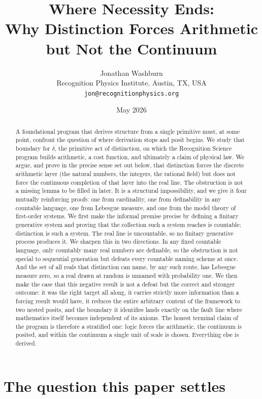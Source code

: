 \documentclass[11pt,a4paper]{article}
\title{%
  Where Necessity Ends:\\
  Why Distinction Forces Arithmetic but Not the Continuum}
\author{%
  Jonathan Washburn\\
  Recognition Physics Institute, Austin, TX, USA\\
  \texttt{jon@recognitionphysics.org}}
\date{May 2026}
\theoremstyle{definition}
\theoremstyle{remark}
\begin{document}
\maketitle

\begin{abstract}\sloppy
A foundational program that derives structure from a single primitive must, at
some point, confront the question of where derivation stops and posit begins. We
study that boundary for $\delta$, the primitive act of distinction, on which the
Recognition Science program builds arithmetic, a cost function, and ultimately a
claim of physical law. We argue, and prove in the precise sense set out below,
that distinction forces the discrete arithmetic layer (the natural numbers, the
integers, the rational field) but does not force the continuous completion of
that layer into the real line. The obstruction is not a missing lemma to be
filled in later. It is a structural impossibility, and we give it four
mutually reinforcing proofs: one from cardinality, one from definability in any
countable language, one from Lebesgue measure, and one from the model theory of
first-order systems. We first make the informal premise precise by defining a
finitary generative system and proving that the collection such a system reaches
is countable; distinction is such a system. The real line is uncountable, so no
finitary generative process produces it. We sharpen this in two directions. In
any fixed countable language, only countably many real numbers are definable, so
the obstruction is not special to sequential generation but defeats every
countable naming scheme at once. And the set of all reals that distinction can
name, by any such route, has Lebesgue measure zero, so a real drawn at random is
unnamed with probability one. We then make the case that this negative result is
not a defeat but the correct and stronger outcome: it was the right target all
along, it carries strictly more information than a forcing result would have, it
reduces the entire arbitrary content of the framework to two nested posits, and
the boundary it identifies lands exactly on the fault line where mathematics
itself becomes independent of its axioms. The honest terminal claim of the
program is therefore a stratified one: logic forces the arithmetic, the continuum
is posited, and within the continuum a single unit of scale is chosen. Everything
else is derived.
\end{abstract}

\tableofcontents

\section{The question this paper settles}
\end{document}
